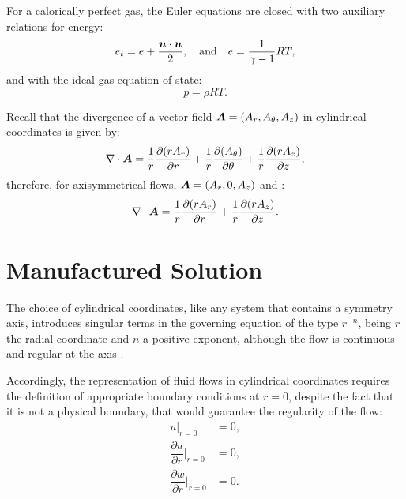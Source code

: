 \documentclass[10pt]{article}
\newcommand{\bv}[1]{\ensuremath{\mbox{\boldmath$ #1 $}}}
\newcommand{\Diff}[2] {\dfrac{\partial( #1)}{\partial #2}}
\newcommand{\diff}[2] {\dfrac{\partial #1}{\partial #2}}
\begin{document}
For a calorically perfect gas, the Euler equations are closed with two auxiliary relations for energy:
\begin{equation}
 \label{eq:euler_04}
e_t= e+\dfrac{\bv{u}\cdot \bv{u}}{2},\quad\mbox{and}\quad e=\dfrac{1}{\gamma -1}RT ,
\end{equation}
and with the ideal gas equation of state:
\begin{equation}
 \label{eq:euler_05}
p=\rho RT.
\end{equation}


Recall that the  divergence of a vector field $\bv{A}=(A_r,A_\theta,A_z)$ in cylindrical coordinates is given by:
\begin{equation*}
 \nabla\cdot \bv{A}= \dfrac{1}{r}\Diff{r A_r}{r} +\dfrac{1}{r}\Diff{ A_\theta}{\theta} +\dfrac{1}{r}\Diff{r A_z}{z},
\end{equation*}
therefore, for axisymmetrical flows,  $\bv{A}=(A_r,0,A_z)$  and :
\begin{equation*}
 \nabla\cdot \bv{A}= \dfrac{1}{r}\Diff{r A_r}{r}  +\dfrac{1}{r}\Diff{r A_z}{z}.
\end{equation*}


\section{Manufactured Solution}

The choice of cylindrical coordinates, like any system that contains a symmetry axis, introduces singular terms in the governing equation of the type $r^{-n}$, being $r$ the radial coordinate and $n$ a positive exponent, %
 although the flow is continuous and regular at the axis \cite{Domenichini2004}.


Accordingly, the representation of fluid flows in cylindrical coordinates requires the definition of appropriate boundary conditions at $r=0$, despite the fact that it is not a physical boundary, that would guarantee the regularity of the flow: %
\begin{equation}
\label{cc}
\begin{split}
u \big| _{r=0} &=0,\\
 \diff{u}{r}\Big| _{r=0} &=0,\\
\diff{w}{r}\Big| _{r=0} &=0.\\
\end{split}
\end{equation}
\end{document}
